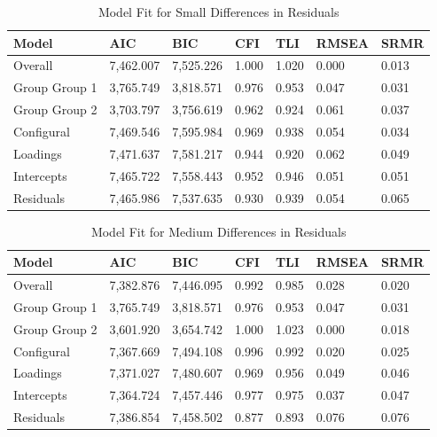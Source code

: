 \documentclass[
  man]{apa7}
\begin{document}
\begin{table}[tbp]

\begin{center}
\begin{threeparttable}

\caption{\label{tab:tab8}Model Fit for Small Differences in Residuals}

\begin{tabular}{lllllll}
\toprule
Model & AIC & BIC & CFI & TLI & RMSEA & SRMR\\
\midrule
Overall & 7,462.007 & 7,525.226 & 1.000 & 1.020 & 0.000 & 0.013\\
Group Group 1 & 3,765.749 & 3,818.571 & 0.976 & 0.953 & 0.047 & 0.031\\
Group Group 2 & 3,703.797 & 3,756.619 & 0.962 & 0.924 & 0.061 & 0.037\\
Configural & 7,469.546 & 7,595.984 & 0.969 & 0.938 & 0.054 & 0.034\\
Loadings & 7,471.637 & 7,581.217 & 0.944 & 0.920 & 0.062 & 0.049\\
Intercepts & 7,465.722 & 7,558.443 & 0.952 & 0.946 & 0.051 & 0.051\\
Residuals & 7,465.986 & 7,537.635 & 0.930 & 0.939 & 0.054 & 0.065\\
\bottomrule
\end{tabular}

\end{threeparttable}
\end{center}

\end{table}

\begin{table}[tbp]

\begin{center}
\begin{threeparttable}

\caption{\label{tab:tab9}Model Fit for Medium Differences in Residuals}

\begin{tabular}{lllllll}
\toprule
Model & AIC & BIC & CFI & TLI & RMSEA & SRMR\\
\midrule
Overall & 7,382.876 & 7,446.095 & 0.992 & 0.985 & 0.028 & 0.020\\
Group Group 1 & 3,765.749 & 3,818.571 & 0.976 & 0.953 & 0.047 & 0.031\\
Group Group 2 & 3,601.920 & 3,654.742 & 1.000 & 1.023 & 0.000 & 0.018\\
Configural & 7,367.669 & 7,494.108 & 0.996 & 0.992 & 0.020 & 0.025\\
Loadings & 7,371.027 & 7,480.607 & 0.969 & 0.956 & 0.049 & 0.046\\
Intercepts & 7,364.724 & 7,457.446 & 0.977 & 0.975 & 0.037 & 0.047\\
Residuals & 7,386.854 & 7,458.502 & 0.877 & 0.893 & 0.076 & 0.076\\
\bottomrule
\end{tabular}

\end{threeparttable}
\end{center}

\end{table}
\end{document}
